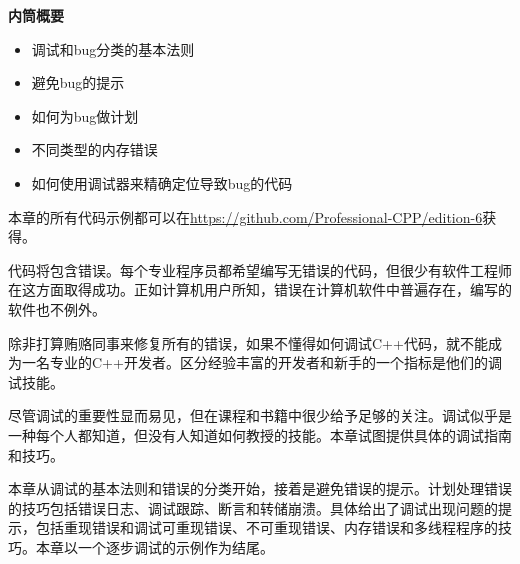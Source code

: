 \noindent
\textbf{内筒概要}

\begin{itemize}
\item
调试和bug分类的基本法则

\item
避免bug的提示

\item
如何为bug做计划

\item
不同类型的内存错误

\item
如何使用调试器来精确定位导致bug的代码
\end{itemize}

本章的所有代码示例都可以在\url{https://github.com/Professional-CPP/edition-6}获得。

代码将包含错误。每个专业程序员都希望编写无错误的代码，但很少有软件工程师在这方面取得成功。正如计算机用户所知，错误在计算机软件中普遍存在，编写的软件也不例外。

除非打算贿赂同事来修复所有的错误，如果不懂得如何调试C++代码，就不能成为一名专业的C++开发者。区分经验丰富的开发者和新手的一个指标是他们的调试技能。

尽管调试的重要性显而易见，但在课程和书籍中很少给予足够的关注。调试似乎是一种每个人都知道，但没有人知道如何教授的技能。本章试图提供具体的调试指南和技巧。

本章从调试的基本法则和错误的分类开始，接着是避免错误的提示。计划处理错误的技巧包括错误日志、调试跟踪、断言和转储崩溃。具体给出了调试出现问题的提示，包括重现错误和调试可重现错误、不可重现错误、内存错误和多线程程序的技巧。本章以一个逐步调试的示例作为结尾。

